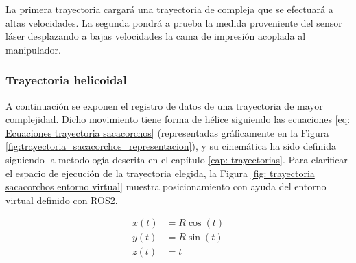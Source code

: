 La primera trayectoria cargará una trayectoria de compleja que se efectuará a altas velocidades. La segunda pondrá a prueba la medida proveniente del sensor láser desplazando a bajas velocidades la cama de impresión acoplada al manipulador.

\subsubsection*{Trayectoria helicoidal}
\hypertarget{Trayectoria helicoidal}{}
A continuación se exponen el registro de datos de una trayectoria de mayor complejidad. Dicho movimiento tiene forma de hélice siguiendo las ecuaciones \ref{eq: Ecuaciones trayectoria sacacorchos} (representadas gráficamente en la Figura \ref{fig:trayectoria_sacacorchos_representacion}), y su cinemática ha sido definida siguiendo la metodología descrita en el capítulo \ref{cap: trayectorias}. Para clarificar el espacio de ejecución de la trayectoria elegida, la Figura \ref{fig: trayectoria sacacorchos entorno virtual} muestra posicionamiento con ayuda del entorno virtual definido con ROS2.

\begin{equation}
\label{eq: Ecuaciones trayectoria sacacorchos}
    \begin{align}
    x(t) &= R \cos(t) \\
    y(t) &= R \sin(t) \\
    z(t) &=  t
    \end{align}
\end{equation}

